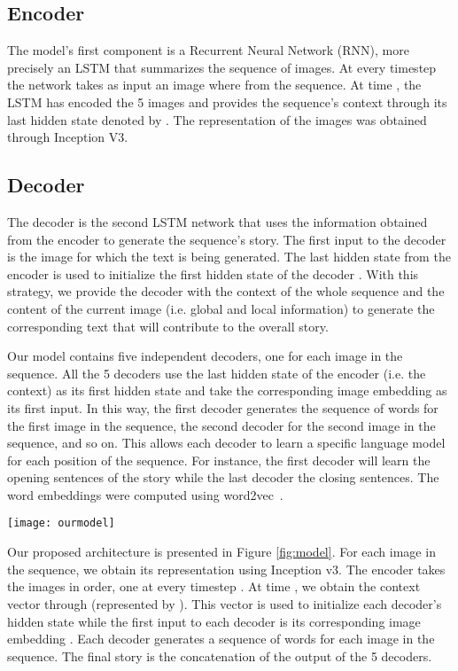\documentclass[11pt,a4paper]{article}
\begin{document}
\subsection{Encoder}

The model's first component is a Recurrent Neural Network (RNN), more precisely an LSTM that summarizes the sequence of images. At every timestep  the network takes as input an image  where  from the sequence. At time , the LSTM has encoded the 5 images and provides the sequence's context through its last hidden state denoted by . The representation of the images was obtained through Inception V3.

\subsection{Decoder}

The decoder is the second LSTM network that uses the information obtained from the encoder to generate the sequence's story.   
The first input  to the decoder is the image for which the text is being generated. 
The last hidden state from the encoder  is used to initialize the first hidden state of the decoder . 
With this strategy, we provide the decoder with the context of the whole sequence and the content of the current image (i.e. global and local information) to generate the corresponding text that will contribute to the overall story. 

Our model contains five independent decoders, one for each image in the sequence. 
All the 5 decoders use the last hidden state of the encoder (i.e. the context) as its first hidden state and take the corresponding image embedding as its first input. 
In this way, the first decoder generates the sequence of words for the first image in the sequence, the second decoder for the second image in the sequence, and so on. 
This allows each decoder to learn a specific language model for each position of the sequence.
For instance, the first decoder will learn the opening sentences of the story while the last decoder the closing sentences.
The word embeddings were computed using word2vec~\cite{mikolov}.

\begin{figure*}[h!]
    \centering
    \texttt{[image: ourmodel]}
    \caption{Proposed sequence to sequence architecture.} 
    \label{fig:model}
\end{figure*}

Our proposed architecture is presented in Figure \ref{fig:model}. For each image in the sequence, we obtain its representation  using Inception v3. The encoder takes the images in order, one at every timestep . At time , we obtain the context vector through  (represented by ). This vector is used to initialize each decoder's hidden state while the first input to each decoder is its corresponding image embedding . Each decoder generates a sequence of words  for each image in the sequence. The final story is the concatenation of the output of the 5 decoders.
\end{document}
